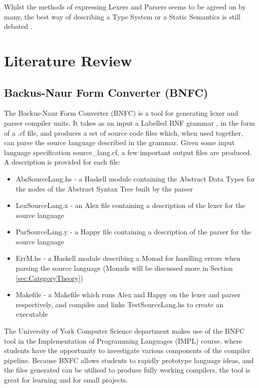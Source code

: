 \documentclass{UoYCSproject}
\begin{document}
Whilst the methods of expressing Lexers and Parsers seems to be agreed on by
many, the best way of describing a Type System or a Static Semantics is still
debated \cite{NeilJones}.

\chapter{Literature Review}

\section{Backus-Naur Form Converter (BNFC)}
\label{sec:BNFC}

The Backus-Naur Form Converter (BNFC) is a tool for generating lexer and parser
compiler units. It takes as an input a Labelled BNF grammar \cite{LBNFReport},
in the form of a {\ttfamily .cf} file, and produces a set of source code files
which, when used together, can parse the source language described in the
grammar. Given some input language specification {\ttfamily source\_lang.cf},
a few important output files are produced. A description is provided for each
file:
\begin{itemize}
    \item {\ttfamily AbsSourceLang.hs} - a Haskell module containing the Abstract
        Data Types for the nodes of the Abstract Syntax Tree built by the
        parser
    \item {\ttfamily LexSourceLang.x} - an Alex file containing a description
        of the lexer for the source language
    \item {\ttfamily ParSourceLang.y} - a Happy file containing a description
        of the parser for the source language
    \item {\ttfamily ErrM.hs} - a Haskell module describing a Monad for handling
        errors when parsing the source language (Monads will be discussed more
        in Section \ref{sec:CategoryTheory})
    \item {\ttfamily Makefile} - a Makefile which runs Alex and Happy on the
        lexer and parser respectively, and compiles and links TestSourceLang.hs
        to create an executable
\end{itemize}

The University of York Computer Science department makes use of the BNFC tool
in the Implementation of Programming Languages (IMPL) course, where students
have the opportunity to investigate various components of the compiler pipeline.
Because BNFC allows students to rapidly prototype language ideas, and the files
generated can be utilised to produce fully working compilers, the tool is great
for learning and for small projects.
\end{document}
